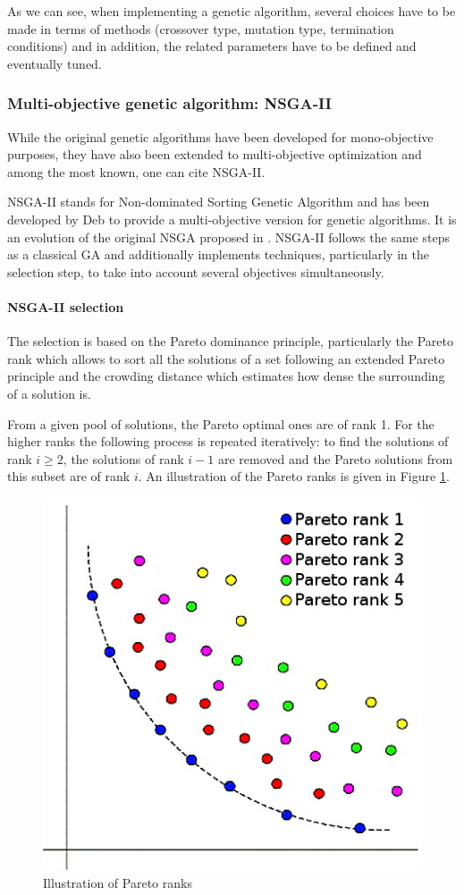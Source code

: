 As we can see, when implementing a genetic algorithm, several choices have to be made in terms of methods (crossover type, mutation type, termination conditions) and in addition, the related parameters have to be defined and eventually tuned.

\subsubsection{Multi-objective genetic algorithm: NSGA-II}
While the original genetic algorithms have been developed for mono-objective purposes, they have also been extended to multi-objective optimization and among the most known, one can cite NSGA-II.

NSGA-II stands for Non-dominated Sorting Genetic Algorithm and has been developed by Deb \cite{Deb00afast} to provide a multi-objective version for genetic algorithms. It is an evolution of the original NSGA proposed in \cite{Srinivas94multiobjectiveoptimization}. NSGA-II follows the same steps as a classical GA and additionally implements techniques, particularly in the selection step, to take into account several objectives simultaneously.

\paragraph{NSGA-II selection}
The selection is based on the Pareto dominance principle, particularly the Pareto rank which allows to sort all the solutions of a set following an extended Pareto principle and the crowding distance which estimates how dense the surrounding of a solution is.
\begin{definition}
From a given pool of solutions, the Pareto optimal ones are of rank 1. For the higher ranks the following process is repeated iteratively: to find the solutions of rank $i \geq 2$, the solutions of rank $i-1$ are removed and the Pareto solutions from this subset are of rank $i$. An illustration of the Pareto ranks is given in Figure \ref{fig:paretorank}.
\end{definition}

\begin{figure}[h!]
\begin{center}
\includegraphics[width=0.6\linewidth]{paretorank}
\end{center}
\caption{Illustration of Pareto ranks}
\label{fig:paretorank}
\end{figure}

